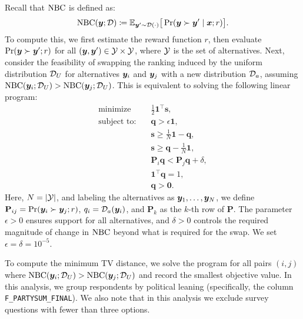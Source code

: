 Recall that ${\rm NBC}$ is defined as:
\[
{\rm NBC}({\bm{y}}; {\mathcal{D}}) \coloneqq \mathbb{E}_{{\bm{y}}' \sim {\mathcal{D}}(\cdot)} \big[\Pr({\bm{y}} \succ {\bm{y}}' \mid {\bm{x}}; r)\big].
\]
To compute this, we first estimate the reward function \(r\), then evaluate \(\Pr({\bm{y}} \succ {\bm{y}}'; r)\) for all \(({\bm{y}}, {\bm{y}}') \in {\mathcal{Y}} \times {\mathcal{Y}}\), where \({\mathcal{Y}}\) is the set of alternatives. 
Next, consider the feasibility of swapping the ranking induced by the uniform distribution \({\mathcal{D}}_U\) for alternatives \({\bm{y}}_i\) and \({\bm{y}}_j\) with a new distribution \({\mathcal{D}}_a\), assuming \({\rm NBC}({\bm{y}}_i; {\mathcal{D}}_U) > {\rm NBC}({\bm{y}}_j; {\mathcal{D}}_U)\). This is equivalent to solving the following linear program:
\[
\begin{aligned}
     \text{minimize}& \quad \frac{1}{2} \mathbf{1}^\top \mathbf{s}, \\
    \text{subject to:} 
    & \quad \mathbf{q} > \epsilon \mathbf{1}, \\
    & \quad \mathbf{s} \geq \frac{1}{N} \mathbf{1} - \mathbf{q}, \\
    & \quad \mathbf{s} \geq \mathbf{q} - \frac{1}{N} \mathbf{1}, \\
    & \quad \mathbf{P}_{i} \mathbf{q} < \mathbf{P}_{j} \mathbf{q} + \delta, \\
    & \quad \mathbf{1}^\top \mathbf{q} = 1, \\
    & \quad \mathbf{q} > \mathbf{0}.
\end{aligned}
\]
Here, \(N = |{\mathcal{Y}}|\), and labeling the alternatives as \({\bm{y}}_1, \dots, {\bm{y}}_N\), we define \(\mathbf{P}_{ij} = \Pr({\bm{y}}_i \succ {\bm{y}}_j; r)\), \(q_i = {\mathcal{D}}_a({\bm{y}}_i)\), and \(\mathbf{P}_k\) as the \(k\)-th row of \(\mathbf{P}\). The parameter \(\epsilon > 0\) ensures support for all alternatives, and \(\delta > 0\) controls the required magnitude of change in \({\rm NBC}\) beyond what is required for the swap. We set \(\epsilon = \delta = 10^{-5}\). 

To compute the minimum TV distance, we solve the program for all pairs \((i, j)\) where \({\rm NBC}({\bm{y}}_i; {\mathcal{D}}_U) > {\rm NBC}({\bm{y}}_j; {\mathcal{D}}_U)\) and record the smallest objective value. In this analysis, we group respondents by political leaning (specifically, the column \texttt{F\_PARTYSUM\_FINAL}). We also note that in this analysis we exclude survey questions with fewer than three options. 



